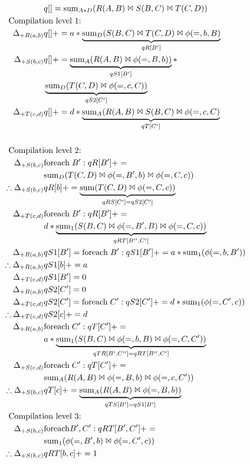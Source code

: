 \begin{align*}
& q[] = \algsum_{A*D}(R(A,B) \Join S(B,C) \Join T(C,D))\\
& \hspace{-1.5cm}\mbox{Compilation level 1:}\\
\Delta_{+R(a,b)} & q[] +=
a * \underbrace{\algsum_{D}(S(B,C) \Join T(C,D) \Join \phi(=,b,B)}_{qR[B']}\\
\Delta_{+S(b,c)} & q[] +=
\underbrace{\algsum_{A}(R(A,B) \Join \phi(=,B,b))}_{qS1[B']} * \\
& \underbrace{\algsum_{D}(T(C,D) \Join \phi(=,c,C))}_{qS2[C']}\\
\Delta_{+T(c,d)} & q[] +=
d * \underbrace{\algsum_{A}(R(A,B) \Join S(B,C) \Join \phi(=,c,C)}_{qT[C']}\\
\\
& \hspace{-1.5cm}\mbox{Compilation level 2:}\\
\Delta_{+S(b,c)} & \algforeach \; B': qR[B'] += \\
& \algsum_{D}(T(C,D) \Join \phi(=,B',b) \Join \phi(=,C,c))
 \\
\therefore \Delta_{+S(b,c)} & qR[b] +=
\underbrace{\algsum(T(C,D) \Join \phi(=,C,c))}_{qRS[C'] = qS2[C']}
\\
\Delta_{+T(c,d)} & \algforeach \; B': qR[B'] +=  \\
& d * \underbrace{\algsum_{1}(S(B,C) \Join \phi(=,B',B) \Join
  \phi(=,C,c))}_{qRT[B'',C']}
\\
\Delta_{+R(a,b)} & qS1[B'] = \algforeach \; B': qS1[B'] +=
a * \algsum_{1}(\phi(=,b,B'))
\\
\therefore \Delta_{+R(a,b)} & qS1[b] += a \\
\Delta_{+T(c,d)} & qS1[B'] = 0 \\
\Delta_{+R(a,b)} & qS2[C'] = 0 \\
\Delta_{+T(c,d)} & qS2[C'] = \algforeach \; C': qS2[C'] +=
d * \algsum_{1}(\phi(=,C',c))
\\
\therefore \Delta_{+T(c,d)} & qS2[c] += d\\
\Delta_{+R(a,b)} & \algforeach \; C': qT[C'] += \\
& a * \underbrace{\algsum_{1}(S(B,C) \Join \phi(=,b,B) \Join
  \phi(=,C,C'))}_{qTR[B',C''] = qRT[B'',C']}
\\
\Delta_{+S(c,d)} & \algforeach \; C': qT[C'] += \\
& \algsum_{A}(R(A,B) \Join \phi(=,B,b) \Join \phi(=,c,C'))\\
\therefore \Delta_{+S(b,c)} & qT[c] +=
\underbrace{\algsum_{A}(R(A,B) \Join \phi(=,B,b))}_{qTS[B'] = qS1[B']}
\\
& \hspace{-1.5cm}\mbox{Compilation level 3:}\\
\Delta_{+S(b,c)} & \algforeach B',C': qRT[B',C'] += \\
& \algsum_{1}(\phi(=,B',b) \Join \phi(=,C',c))
\\
\therefore \Delta_{+S(b,c)} & qRT[b,c] += 1
\end{align*}


